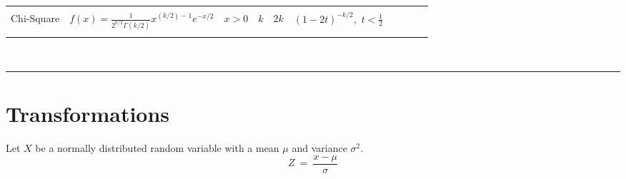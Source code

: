 \documentclass{article}
\newcommand{\HRule}{\rule{\linewidth}{0.25mm}}
\begin{document}
\begin{center}
\begin{tabular}{| l | c | c | c | c | c | c |c |c |c |}
    \hfill          &               &           &           &               & \\
    \hline
    \hfill          &               &           &           &               & \\
Chi-Square   & $f(x) = \displaystyle \frac{1}{2^{k/2} \Gamma(k/2)} x^{(k/2) - 1} e^{-x/2} $  & $x>0$ 	& $k$    & $2k$ & $(1 - 2t)^{-k/2}, \,\, t < \frac{1}{2}$ \\
    \hfill          &               &           &           &               & \\
    \hline
\end{tabular}
\end{center}

\vspace*{-0.25cm}

\hfill\\
\HRule
\vspace*{-0.250cm}

\section*{Transformations}



Let $X$ be a normally distributed random variable with a mean $\mu$ and variance $\sigma^2$.
\begin{equation*}
        Z	~=~ \frac{\displaystyle x - \mu }{ \displaystyle \sigma}
\end{equation*}
\end{document}
